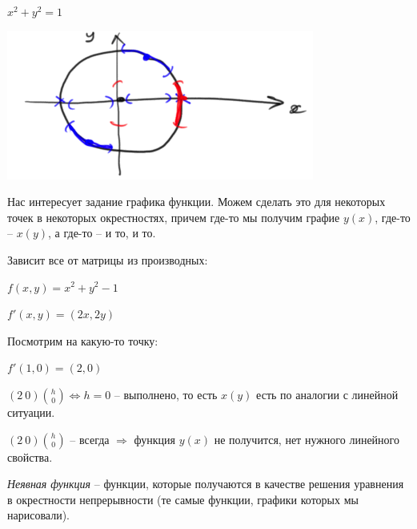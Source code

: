 \begin{example}
    $x^2 + y^2=1$

    \includegraphics[width=0.3\linewidth]{images/07-06-1.png}

    Нас интересует задание графика функции. Можем сделать это для некоторых точек в некоторых окрестностях, причем где-то мы получим графие $y(x)$, где-то – $x(y)$, а где-то – и то, и то.

    Зависит все от матрицы из производных:

    $f(x, y) = x^2 + y^2 - 1$
    
    $f'(x, y) = (2x, 2y)$

    Посмотрим на какую-то точку: 
    
    $f'(1, 0)= (2, 0)$

    $(2\ 0)\binom{h}{0}\Leftrightarrow h=0$ – выполнено, то есть $x(y)$ есть по аналогии с линейной ситуации.
    
    $(2\ 0)\binom{h}{0}$ – всегда $\Rightarrow$ функция $y(x)$ не получится, нет нужного линейного свойства.

    \textit{Неявная функция} – функции, которые получаются в качестве решения уравнения в окрестности непрерывности (те самые функции, графики которых мы нарисовали).
\end{example}

